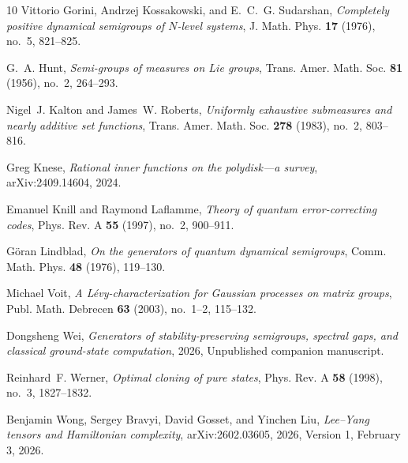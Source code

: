 \documentclass[reqno]{amsart}
\theoremstyle{definition}
\theoremstyle{remark}
\begin{document}
\begin{thebibliography}{10}
Vittorio Gorini, Andrzej Kossakowski, and E.~C.~G. Sudarshan, \emph{Completely
  positive dynamical semigroups of {$N$}-level systems}, J. Math. Phys.
  \textbf{17} (1976), no.~5, 821--825.

G.~A. Hunt, \emph{Semi-groups of measures on {Lie} groups}, Trans. Amer. Math.
  Soc. \textbf{81} (1956), no.~2, 264--293.

Nigel~J. Kalton and James~W. Roberts, \emph{Uniformly exhaustive submeasures
  and nearly additive set functions}, Trans. Amer. Math. Soc. \textbf{278}
  (1983), no.~2, 803--816.

Greg Knese, \emph{Rational inner functions on the polydisk---a survey},
  arXiv:2409.14604, 2024.

Emanuel Knill and Raymond Laflamme, \emph{Theory of quantum error-correcting
  codes}, Phys. Rev. A \textbf{55} (1997), no.~2, 900--911.

G{\"o}ran Lindblad, \emph{On the generators of quantum dynamical semigroups},
  Comm. Math. Phys. \textbf{48} (1976), 119--130.

Michael Voit, \emph{A {L\'{e}vy}-characterization for {Gaussian} processes on
  matrix groups}, Publ. Math. Debrecen \textbf{63} (2003), no.~1--2, 115--132.

Dongsheng Wei, \emph{Generators of stability-preserving semigroups, spectral
  gaps, and classical ground-state computation}, 2026, Unpublished companion
  manuscript.

Reinhard~F. Werner, \emph{Optimal cloning of pure states}, Phys. Rev. A
  \textbf{58} (1998), no.~3, 1827--1832.

Benjamin Wong, Sergey Bravyi, David Gosset, and Yinchen Liu, \emph{{Lee--Yang}
  tensors and {Hamiltonian} complexity}, arXiv:2602.03605, 2026, Version 1,
  February 3, 2026.

\end{thebibliography}
\end{document}
